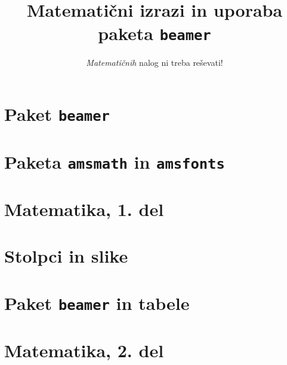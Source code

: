\documentclass{beamer}
\begin{document}
\title{Matematični izrazi in uporaba paketa \texttt{beamer}}
\subtitle{\emph{Matematičnih} nalog ni treba reševati!}
\date{}


\section{Paket \texttt{beamer}}

\section{Paketa \texttt{amsmath} in \texttt{amsfonts}}

\section[Matematika, 1. del\\\large{Analiza, logika, množice}]{Matematika, 1. del}

\section{Stolpci in slike}

\section{Paket \texttt{beamer} in tabele}

\section[Matematika, 2. del\\\large{Zaporedja, algebra, grupe}]{Matematika, 2. del}
\end{document}
